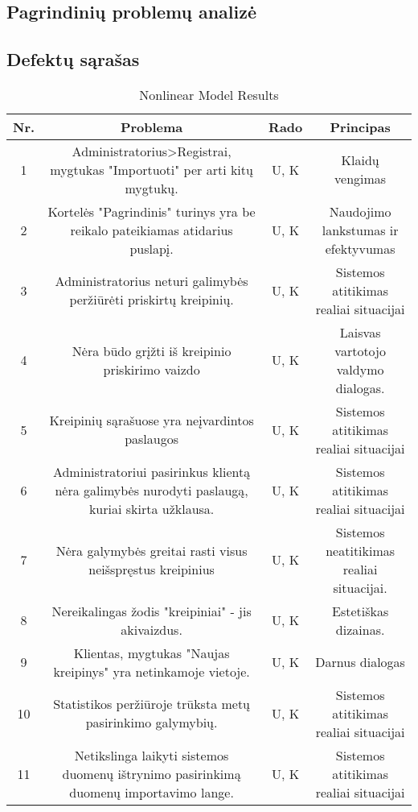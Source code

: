 \subsection{Pagrindinių problemų analizė}
	
\subsection{Defektų sąrašas}
	
	\begin{table}[ht] 
	\caption{Nonlinear Model Results} %
	\centering %
	\begin{tabular}{c c c c} %
	\hline\hline %
	Nr. & Problema & Rado & Principas \\ [0.5ex] %
	\hline %
	1 & Administratorius>Registrai, mygtukas "Importuoti" per arti kitų mygtukų. & U, K & Klaidų vengimas \\ %
	2 & Kortelės "Pagrindinis" turinys yra be reikalo pateikiamas atidarius puslapį. & U, K & Naudojimo lankstumas ir efektyvumas \\
	3 & Administratorius neturi galimybės peržiūrėti priskirtų kreipinių. & U, K & Sistemos atitikimas realiai situacijai \\
	4 & Nėra būdo grįžti iš kreipinio priskirimo vaizdo & U, K & Laisvas vartotojo valdymo dialogas. \\
	5 & Kreipinių sąrašuose yra neįvardintos paslaugos & U, K & Sistemos atitikimas realiai situacijai \\
	6 & Administratoriui pasirinkus klientą nėra galimybės nurodyti paslaugą, kuriai skirta užklausa. & U, K & Sistemos atitikimas realiai situacijai \\
	7 & Nėra galymybės greitai rasti visus neišspręstus kreipinius & U, K & Sistemos neatitikimas realiai situacijai. \\
	8 & Nereikalingas žodis "kreipiniai" - jis akivaizdus. & U, K & Estetiškas dizainas. \\
	9 & Klientas, mygtukas "Naujas kreipinys" yra netinkamoje vietoje. & U, K & Darnus dialogas \\
	10 & Statistikos peržiūroje trūksta metų pasirinkimo galymybių. & U, K & Sistemos atitikimas realiai situacijai \\
	11 & Netikslinga laikyti sistemos duomenų ištrynimo pasirinkimą duomenų importavimo lange. & U, K & Sistemos atitikimas realiai situacijai \\
	\hline %
	\end{tabular} 
	\label{table:nonlin} %
	\end{table} 